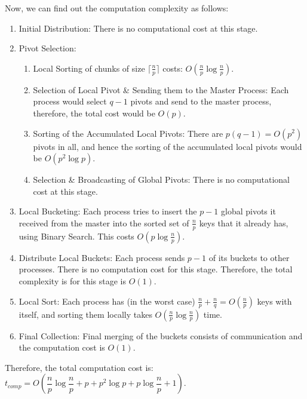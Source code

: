 \documentclass{article}
\begin{document}
Now, we can find out the computation complexity as follows:
\begin{enumerate}
\item Initial Distribution: There is no computational cost at this stage.
\item Pivot Selection: 

  \begin{enumerate}

  \item Local Sorting of chunks of size $\lceil\frac{n}{p}\rceil$ costs: $O(\frac{n}{p}\log{\frac{n}{p}})$.   

  \item Selection of Local Pivot \& Sending them to the Master 
  Process: Each process would select $q-1$ pivots and send to 
  the master process, therefore, the total cost would be $O(p)$.

  \item Sorting of the Accumulated Local Pivots: There are $p(q-1) 
  = O(p^2)$ pivots in all, and hence the sorting of the 
  accumulated local pivots would be $O(p^2\log{p})$.

  \item Selection \& Broadcasting of Global Pivots: There is no
  computational cost at this stage.

  \end{enumerate}

\item Local Bucketing: Each process tries to insert the $p-1$ 
global pivots it received from the master into the sorted set of 
$\frac{n}{p}$ keys that it already has, using Binary Search. 
This costs $O(p\log{\frac{n}{p}})$.

\item Distribute Local Buckets: Each process sends $p-1$ of its
  buckets to other processes. There is no computation cost for this
  stage. Therefore, the total complexity is for this stage is $O(1)$.

\item Local Sort: Each process has (in the worst case) $\frac{n}{p} +
  \frac{n}{q} = O(\frac{n}{p})$ keys with itself, and sorting them
  locally takes $O(\frac{n}{p}\log{\frac{n}{p}})$ time.

\item Final Collection: Final merging of the buckets consists of
  communication and the computation cost is $O(1)$.

\end{enumerate}
Therefore, the total computation cost is: 
$t_{comp} = O\left(\dfrac{n}{p}\log{\dfrac{n}{p}} + p + p^2\log{p} + p\log{\dfrac{n}{p}} + 1\right)$.
\end{document}
